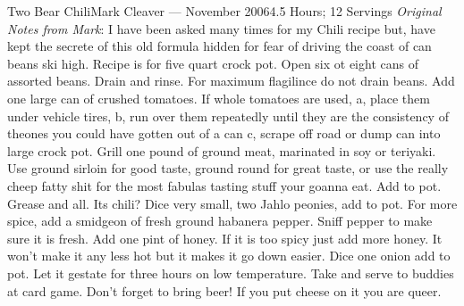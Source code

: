 \documentclass{article}
\begin{document}
\begin{recipe}{Two Bear Chili}{Mark Cleaver --- November 2006}{4.5 Hours; 12 Servings}
   \freeform
   \emph{Original Notes from Mark}:
   \newline\newline
   I have been asked many times for my Chili recipe but, have kept the secrete
   of this old formula hidden for fear of driving the coast of can beans ski
   high.
   \newline\newline
   Recipe is for five quart crock pot.
   \newline\newline
   Open six ot eight cans of assorted beans.  Drain and rinse.  For maximum
   flagilince do not drain beans.
   \newline\newline
   Add one large can of crushed tomatoes.  If whole tomatoes are used,
   \newline\newline
   a, place them under vehicle tires,
   \newline\newline
   b, run over them repeatedly until they are the consistency of theones you
   could have gotten out of a can
   \newline\newline
   c, scrape off road or dump can into large crock pot.
   \newline\newline
   Grill one pound of ground meat, marinated in soy or teriyaki.  Use ground
   sirloin for good taste, ground round for great taste, or use the really cheep
   fatty shit for the most fabulas tasting stuff your goanna eat.
   \newline\newline
   Add to pot.  Grease and all.  Its chili?
   \newline\newline
   Dice very small, two Jahlo peonies, add to pot.  For more spice, add a
   smidgeon of fresh ground habanera pepper.
   \newline\newline
   Sniff pepper to make sure it is fresh.
   \newline\newline
   Add one pint of honey.  If it is too spicy just add more honey.  It won't
   make it any less hot but it makes it go down easier.
   \newline\newline
   Dice one onion add to pot.
   \newline\newline
   Let it gestate for three hours on low temperature.
   \newline\newline
   Take and serve to buddies at card game.  Don't forget to bring beer!
   \newline\newline
   If you put cheese on it you are queer.

\end{recipe}
\end{document}
